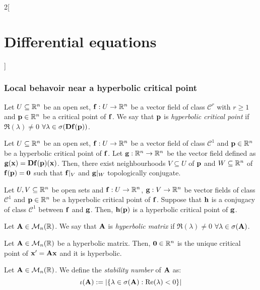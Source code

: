\documentclass[../../../main.tex]{subfiles}
\begin{document}
\begin{multicols}{2}[\section{Differential equations}]
  \subsubsection{Local behavoir near a hyperbolic critical point}
  \begin{definition}
    Let $U\subseteq \mathbb{R}^n$ be an open set, $\boldsymbol{\mathrm{f}}:U\rightarrow\mathbb{R}^n$ be a vector field of class $\mathcal{C}^r$ with $r\geq 1$ and $\boldsymbol{\mathrm{p}}\in\mathbb{R}^n$ be a critical point of $\boldsymbol{\mathrm{f}}$. We say that $\boldsymbol{\mathrm{p}}$ is \emph{hyperbolic critical point} if $\Re(\lambda)\ne 0$ $\forall \lambda\in\sigma(\boldsymbol{\mathrm{Df}}(\boldsymbol{\mathrm{p}}))$.
  \end{definition}
  \begin{theorem}
    Let $U\subseteq \mathbb{R}^n$ be an open set, $\boldsymbol{\mathrm{f}}:U\rightarrow\mathbb{R}^n$ be a vector field of class $\mathcal{C}^1$ and $\boldsymbol{\mathrm{p}}\in\mathbb{R}^n$ be a hyperbolic critical point of $\boldsymbol{\mathrm{f}}$. Let $\boldsymbol{\mathrm{g}}:\mathbb{R}^n\rightarrow\mathbb{R}^n$ be the vector field defined as $\boldsymbol{\mathrm{g}}(\boldsymbol{\mathrm{x}})=\boldsymbol{\mathrm{Df}}(\boldsymbol{\mathrm{p}})(\boldsymbol{\mathrm{x}})$. Then, there exist neighbourhoods $V\subseteq U$ of $\boldsymbol{\mathrm{p}}$ and $W\subseteq \mathbb{R}^n$ of $\boldsymbol{\mathrm{f}}(\boldsymbol{\mathrm{p}})=\boldsymbol{\mathrm{0}}$ such that $\boldsymbol{\mathrm{f}}|_V$ and $\boldsymbol{\mathrm{g}}|_W$ topologically conjugate.
  \end{theorem}
  \begin{corollary}
    Let $U,V\subseteq \mathbb{R}^n$ be open sets and $\boldsymbol{\mathrm{f}}:U\rightarrow\mathbb{R}^n$, $\boldsymbol{\mathrm{g}}:V\rightarrow\mathbb{R}^n$ be vector fields of class $\mathcal{C}^1$ and $\boldsymbol{\mathrm{p}}\in\mathbb{R}^n$ be a hyperbolic critical point of $\boldsymbol{\mathrm{f}}$. Suppose that $\boldsymbol{\mathrm{h}}$ is a conjugacy of class $\mathcal{C}^1$ between $\boldsymbol{\mathrm{f}}$ and $\boldsymbol{\mathrm{g}}$. Then, $\boldsymbol{\mathrm{h}}(\boldsymbol{\mathrm{p}})$ is a hyperbolic critical point of $\boldsymbol{\mathrm{g}}$.
  \end{corollary}
  \begin{definition}
    Let $\boldsymbol{\mathrm{A}}\in\mathcal{M}_n(\mathbb{R})$. We say that $\boldsymbol{\mathrm{A}}$ is \emph{hyperbolic matrix} if $\Re(\lambda)\ne 0$ $\forall\lambda\in\sigma(\boldsymbol{\mathrm{A}})$.
  \end{definition}
  \begin{prop}
    Let $\boldsymbol{\mathrm{A}}\in\mathcal{M}_n(\mathbb{R})$ be a hyperbolic matrix. Then, $\boldsymbol{\mathrm{0}}\in\mathbb{R}^n$ is the unique critical point of $\boldsymbol{\mathrm{x}}'=\boldsymbol{\mathrm{A}}\boldsymbol{\mathrm{x}}$ and it is hyperbolic.
  \end{prop}
  \begin{definition}
    Let $\boldsymbol{\mathrm{A}}\in\mathcal{M}_n(\mathbb{R})$. We define the \emph{stability number} of $\boldsymbol{\mathrm{A}}$ as: $$\iota(\boldsymbol{\mathrm{A}}):=|\{\lambda\in\sigma(\boldsymbol{\mathrm{A}}):\Re(\lambda)<0\}|$$
  \end{definition}
  \begin{theorem}

\end{theorem}
\end{multicols}
\end{document}
